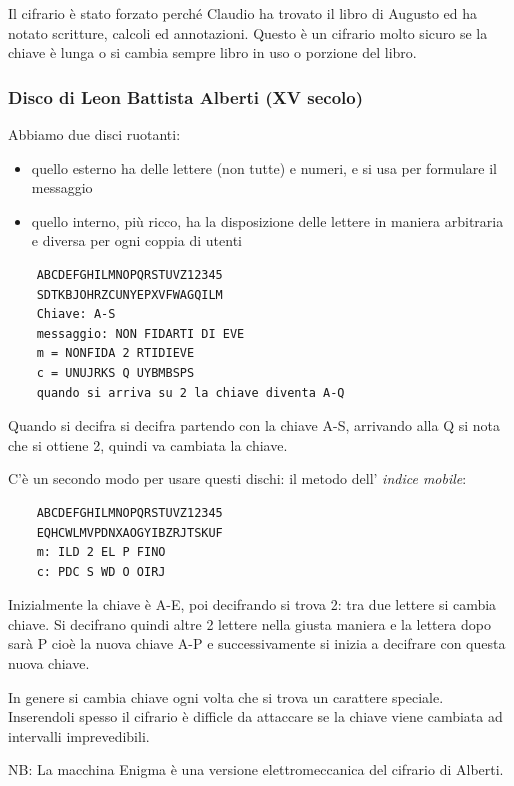 Il cifrario è stato forzato perché Claudio ha trovato il libro di Augusto ed ha notato scritture, calcoli ed annotazioni.
Questo è un cifrario molto sicuro se la chiave è lunga o si cambia sempre libro in uso o porzione del libro.

\subsubsection{Disco di Leon Battista Alberti (XV secolo)}
Abbiamo due disci ruotanti:
\begin{itemize}
    \item quello esterno ha delle lettere (non tutte) e numeri, e si usa per formulare il messaggio
    \item quello interno, più ricco, ha la disposizione delle lettere in maniera arbitraria e diversa per ogni coppia di utenti
\end{itemize}

\begin{verbatim}
    ABCDEFGHILMNOPQRSTUVZ12345
    SDTKBJOHRZCUNYEPXVFWAGQILM
    Chiave: A-S
    messaggio: NON FIDARTI DI EVE
    m = NONFIDA 2 RTIDIEVE
    c = UNUJRKS Q UYBMBSPS
    quando si arriva su 2 la chiave diventa A-Q
\end{verbatim}

Quando si decifra si decifra partendo con la chiave A-S, arrivando alla Q si nota che si ottiene 2, quindi va cambiata la chiave.

C'è un secondo modo per usare questi dischi: il metodo dell' \emph{indice mobile}:
\begin{verbatim}
    ABCDEFGHILMNOPQRSTUVZ12345
    EQHCWLMVPDNXAOGYIBZRJTSKUF
    m: ILD 2 EL P FINO
    c: PDC S WD O OIRJ
\end{verbatim}

Inizialmente la chiave è A-E, poi decifrando si trova 2: tra due lettere si cambia chiave. Si decifrano quindi altre 2 lettere nella giusta maniera e la lettera dopo sarà P cioè la nuova chiave A-P e successivamente si inizia a decifrare con questa nuova chiave.

In genere si cambia chiave ogni volta che si trova un carattere speciale. Inserendoli spesso il cifrario è difficle da attaccare se la chiave viene cambiata ad intervalli imprevedibili.

NB: La macchina Enigma è una versione elettromeccanica del cifrario di Alberti.

